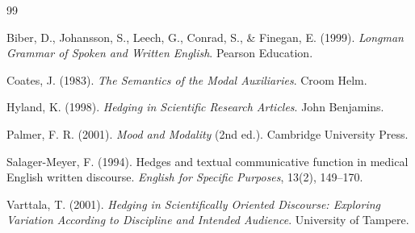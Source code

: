 \documentclass[11pt,a4paper]{article}
\theoremstyle{remark}
\begin{document}

\newpage


\begin{thebibliography}{99}

Biber, D., Johansson, S., Leech, G., Conrad, S., \& Finegan, E. (1999).
\textit{Longman Grammar of Spoken and Written English}.
Pearson Education.

Coates, J. (1983).
\textit{The Semantics of the Modal Auxiliaries}.
Croom Helm.

Hyland, K. (1998).
\textit{Hedging in Scientific Research Articles}.
John Benjamins.

Palmer, F. R. (2001).
\textit{Mood and Modality} (2nd ed.).
Cambridge University Press.

Salager-Meyer, F. (1994).
Hedges and textual communicative function in medical English written discourse.
\textit{English for Specific Purposes}, 13(2), 149--170.

Varttala, T. (2001).
\textit{Hedging in Scientifically Oriented Discourse: Exploring Variation According to Discipline and Intended Audience}.
University of Tampere.

\end{thebibliography}
\end{document}
